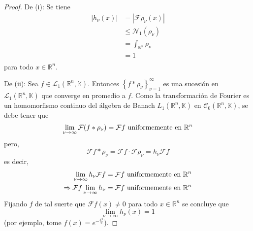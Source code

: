 \documentclass[12pt]{report}
\theoremstyle{largebreak}
\renewcommand{\leq}{\ensuremath{\leqslant}}
\newcommand\abs[1]{\ensuremath{\left|#1\right|}}
\newcommand{\N}[2]{\ensuremath{\mathcal{N}_{#1}\left(#2\right)}}
\newcommand{\fou}[1]{\ensuremath{\mathcal{F}#1}}
\begin{document}
    \begin{proof}
        De (i): Se tiene
        \begin{equation*}
            \begin{split}
                \abs{h_\nu(x)}&=\abs{\fou{\rho_\nu}(x)}\\
                &\leq\N{1}{\rho_\nu}\\
                &=\int_{\mathbb{R}^n}\rho_\nu\\
                &=1\\
            \end{split}
        \end{equation*}
        para todo $x\in\mathbb{R}^n$.

        De (ii): Sea $f\in\mathcal{L}_1(\mathbb{R}^n,\mathbb{K})$. Entonces $\left\{f*\rho_\nu \right\}_{ \nu=1}^\infty$ es una sucesión en $\mathcal{L}_1(\mathbb{R}^n,\mathbb{K})$ que converge en promedio a $f$. Como la transformación de Fourier es un homomorfismo continuo del álgebra de Banach $L_1(\mathbb{R}^n,\mathbb{K})$ en $\mathcal{C}_0(\mathbb{R}^n,\mathbb{K})$, se debe tener que
        \begin{equation*}
            \lim_{\nu\rightarrow\infty}\fou{(f*\rho_\nu)}=\fou{f}\textup{ uniformemente en }\mathbb{R}^n
        \end{equation*}
        pero,
        \begin{equation*}
            \fou{f*\rho_\nu}=\fou{f}\cdot\fou{\rho_\nu}=h_\nu\fou{f}
        \end{equation*}
        es decir,
        \begin{equation*}
            \begin{split}
                \lim_{\nu\rightarrow\infty}h_\nu\fou{f}&=\fou{f}\textup{ uniformemente en }\mathbb{R}^n\\
                \Rightarrow \fou{f}\lim_{\nu\rightarrow\infty}h_\nu&=\fou{f}\textup{ uniformemente en }\mathbb{R}^n\\
            \end{split}
        \end{equation*}
        Fijando $f$ de tal suerte que $\fou{f}(x)\neq0$ para todo $x\in\mathbb{R}^n$ se concluye que
        \begin{equation*}
            \lim_{\nu\rightarrow\infty}h_\nu(x)=1
        \end{equation*}
        (por ejemplo, tome $f(x)=e^{-\frac{x^2}{2}}$).
    \end{proof}
\end{document}
